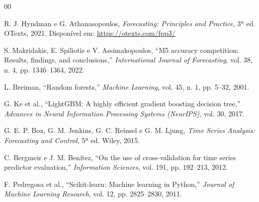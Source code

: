 \documentclass[12pt, a4paper]{article}
\begin{document}
\newpage

\begin{thebibliography}{00}

R. J. Hyndman e G. Athanasopoulos,
\textit{Forecasting: Principles and Practice}, 3ª ed.
OTexts, 2021. Disponível em: \url{https://otexts.com/fpp3/}

S. Makridakis, E. Spiliotis e V. Assimakopoulos,
``M5 accuracy competition: Results, findings, and conclusions,''
\textit{International Journal of Forecasting}, vol. 38, n. 4,
pp. 1346--1364, 2022.

L. Breiman,
``Random forests,''
\textit{Machine Learning}, vol. 45, n. 1, pp. 5--32, 2001.

G. Ke et al.,
``LightGBM: A highly efficient gradient boosting decision tree,''
\textit{Advances in Neural Information Processing Systems (NeurIPS)},
vol. 30, 2017.

G. E. P. Box, G. M. Jenkins, G. C. Reinsel e G. M. Ljung,
\textit{Time Series Analysis: Forecasting and Control}, 5ª ed.
Wiley, 2015.

C. Bergmeir e J. M. Benítez,
``On the use of cross-validation for time series predictor evaluation,''
\textit{Information Sciences}, vol. 191, pp. 192--213, 2012.

F. Pedregosa et al.,
``Scikit-learn: Machine learning in Python,''
\textit{Journal of Machine Learning Research}, vol. 12,
pp. 2825--2830, 2011.

\end{thebibliography}
\end{document}
